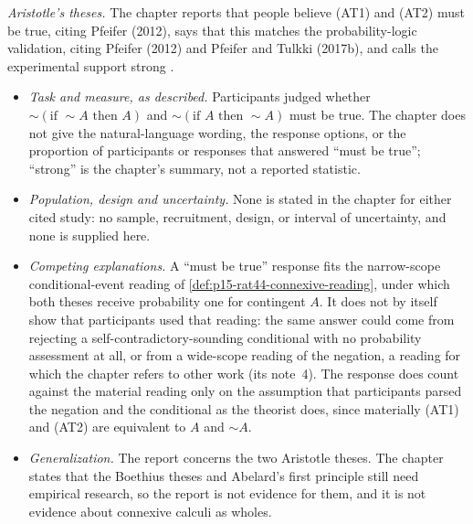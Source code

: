 \emph{Aristotle's theses.} The chapter reports that people believe
(AT1) and (AT2) must be true, citing Pfeifer (2012), says that this
matches the probability-logic validation, citing Pfeifer (2012) and
Pfeifer and Tulkki (2017b), and calls the experimental support strong
\cite[p.~280]{Pfeifer2021ProbabilityLogic}.
\begin{itemize}
\item \emph{Task and measure, as described.} Participants judged
      whether \(\sim(\text{if }\sim A\text{ then }A)\) and
      \(\sim(\text{if }A\text{ then }\sim A)\) must be true. The
      chapter does not give the natural-language wording, the response
      options, or the proportion of participants or responses that
      answered ``must be true''; ``strong'' is the chapter's summary,
      not a reported statistic.
\item \emph{Population, design and uncertainty.} None is stated in the
      chapter for either cited study: no sample, recruitment, design,
      or interval of uncertainty, and none is supplied here.
\item \emph{Competing explanations.} A ``must be true'' response fits
      the narrow-scope conditional-event reading of
      \cref{def:p15-rat44-connexive-reading}, under which both theses
      receive probability one for contingent \(A\). It does not by
      itself show that participants used that reading: the same answer
      could come from rejecting a self-contradictory-sounding conditional
      with no probability assessment at all, or from a wide-scope reading
      of the negation, a reading for which the chapter refers to other work
      (its note~4). The
      response does count against the material reading only on the
      assumption that participants parsed the negation and the
      conditional as the theorist does, since materially (AT1) and (AT2)
      are equivalent to \(A\) and \(\sim A\).
\item \emph{Generalization.} The report concerns the two Aristotle
      theses. The chapter states that the Boethius theses and Abelard's
      first principle still need empirical research, so the report is
      not evidence for them, and it is not evidence about connexive
      calculi as wholes.
\end{itemize}

